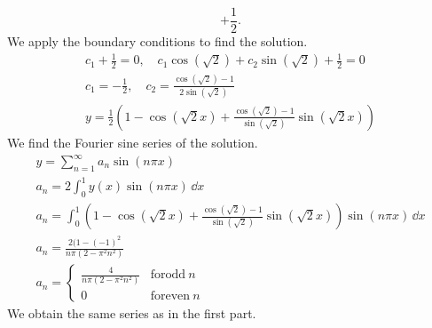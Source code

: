 {\begin{Solution}
\begin{enumerate}
\[    + \frac{1}{2}.
    \]
    We apply the boundary conditions to find the solution.
    \begin{gather*}
      c_1 + \frac{1}{2} = 0, \quad  
      c_1 \cos \left( \sqrt{2} \right) 
      + c_2 \sin \left( \sqrt{2} \right) + \frac{1}{2} = 0
      \\
      c_1 = - \frac{1}{2}, \quad
      c_2 = \frac{ \cos \left( \sqrt{2} \right) - 1 }
      { 2 \sin \left( \sqrt{2} \right) }
      \\
      \boxed{
        y = \frac{1}{2} \left( 1 - \cos \left( \sqrt{2} x \right) 
          +  \frac{ \cos \left( \sqrt{2} \right) - 1 }
          { \sin \left( \sqrt{2} \right) } \sin \left( \sqrt{2} x \right) \right)
        }
    \end{gather*}
    We find the Fourier sine series of the solution.
    \begin{gather*}
      y = \sum_{n = 1}^\infty a_n \sin(n \pi x)
      \\
      a_n = 2 \int_0^1 y(x) \sin(n \pi x) \,\dd x 
      \\
      a_n = \int_0^1  \left( 1 - \cos \left( \sqrt{2} x \right) 
        +  \frac{ \cos \left( \sqrt{2} \right) - 1 }
        { \sin \left( \sqrt{2} \right) } \sin \left( \sqrt{2} x \right) \right)
      \sin(n \pi x) \,\dd x 
      \\
      a_n = \frac{2 (1 - (-1)^2}{n \pi (2 - \pi^2 n^2)}
      \\
      a_n = \begin{cases}
        \frac{4}{n \pi (2 - \pi^2 n^2)} &\mathrm{for odd}\ n \\
        0 &\mathrm{for even}\ n
      \end{cases}
    \end{gather*}
    We obtain the same series as in the first part.
  \end{enumerate}
\end{Solution}







}
